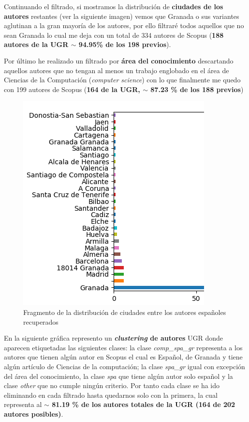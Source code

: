 Continuando el filtrado, si mostramos la distribución de \textbf{ciudades de los autores} restantes (ver la siguiente imagen) vemos que Granada o sus variantes aglutinan a la gran mayoría de los autores, por ello filtraré todos aquellos que no sean Granada lo cual me deja con un total de 334 autores de Scopus (\textbf{188 autores de la \acrshort{UGR} $\sim$ 94.95\% de los 198 previos}).

Por último he realizado un filtrado por \textbf{área del conocimiento} descartando aquellos autores que no tengan al menos un trabajo englobado en el área de Ciencias de la Computación (\textit{computer science}) con lo que finalmente me quedo con 199 autores de Scopus (\textbf{164 de la \acrshort{UGR}, $\sim$ 87.23 \% de los 188 previos})

\begin{figure}[h]
	
	\centering
	\includegraphics[width=0.5775\linewidth]{imagenes/city_hist}
	\caption{Fragmento de la distribución de ciudades entre los autores españoles recuperados}
\end{figure}
\newpage

En la siguiente gráfica represento un \textbf{\textit{clustering} de autores} \acrshort{UGR} donde aparecen etiquetadas las siguientes clases: la clase \textit{comp\_spa\_gr} representa a los autores que tienen algún autor en Scopus el cual es Español, de Granada y tiene algún artículo de Ciencias de la computación; la clase \textit{spa\_gr} igual con excepción del área del conocimiento, la clase \textit{spa} que tiene algún autor solo español y la clase \textit{other} que no cumple ningún criterio. Por tanto cada clase se ha ido eliminando en cada filtrado hasta quedarnos solo con la primera, la cual representa al \textbf{$\sim$ 81.19 \% de los autores totales de la \acrshort{UGR} (164 de 202 autores posibles)}.

